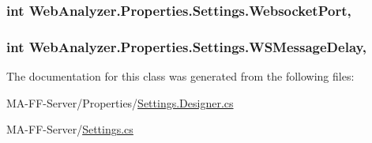 \subsubsection[{Websocket\+Port}]{\setlength{\rightskip}{0pt plus 5cm}int Web\+Analyzer.\+Properties.\+Settings.\+Websocket\+Port\hspace{0.3cm}{\ttfamily [get]}, {\ttfamily [set]}}\label{class_web_analyzer_1_1_properties_1_1_settings_ab28fb58a6d2cf2841c86966c406a4ab3}
\hypertarget{class_web_analyzer_1_1_properties_1_1_settings_a62b7526a2c670219322da46a41f2ed4b}{}
\subsubsection[{W\+S\+Message\+Delay}]{\setlength{\rightskip}{0pt plus 5cm}int Web\+Analyzer.\+Properties.\+Settings.\+W\+S\+Message\+Delay\hspace{0.3cm}{\ttfamily [get]}, {\ttfamily [set]}}\label{class_web_analyzer_1_1_properties_1_1_settings_a62b7526a2c670219322da46a41f2ed4b}


The documentation for this class was generated from the following files\+:\begin{DoxyCompactItemize}
\item 
M\+A-\/\+F\+F-\/\+Server/\+Properties/\hyperlink{_settings_8_designer_8cs}{Settings.\+Designer.\+cs}\item 
M\+A-\/\+F\+F-\/\+Server/\hyperlink{_settings_8cs}{Settings.\+cs}\end{DoxyCompactItemize}
